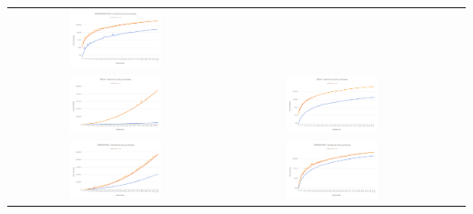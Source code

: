 \begin{center}
\begin{tabular}{cccc}
	  \includegraphics[width=0.45\textwidth]{imagenes/testperformance/MONOperformanceLOG.png} \\
	  \includegraphics[width=0.45\textwidth]{imagenes/testperformance/ONDASperformanceLIN.png} &
	  \includegraphics[width=0.45\textwidth]{imagenes/testperformance/ONDASperformanceLOG.png} \\
	  \includegraphics[width=0.45\textwidth]{imagenes/testperformance/TEMPperformance.png} &
	  \includegraphics[width=0.45\textwidth]{imagenes/testperformance/TEMPperformanceLOG.png} \\
	\end{tabular}
   \end{center}

